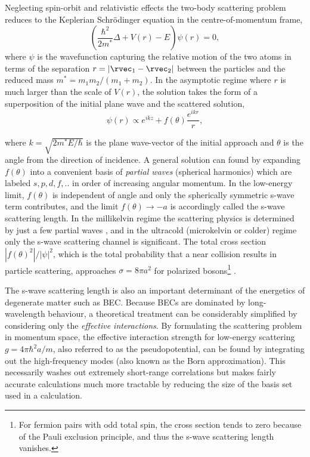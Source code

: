 	Neglecting spin-orbit and relativistic effects the two-body scattering problem reduces to the Keplerian Schr\"{o}dinger equation in the centre-of-momentum frame,
	\begin{equation}
	\left(\frac{\hbar^2}{2m^*}\Delta + V(r) - E\right)\psi(r) = 0,
	\end{equation}
	where $\psi$ is the wavefunction capturing the relative motion of the two atoms	in terms of the separation $r=|\rvec_1-\rvec_2|$ between the particles and the reduced mass $m^*=m_1m_2/(m_1+m_2)$.
	In the asymptotic regime where $r$ is much larger than the scale of $V(r)$, the solution takes the form of a superposition of the initial plane wave and the scattered solution,
	\begin{equation}
	\psi(r) \propto e^{ikz} + f(\theta)\frac{e^{ikr}}{r},
	\end{equation}

	where $k=\sqrt{2m^*E/\hbar}$ is the plane wave-vector of the initial approach and $\theta$ is the angle from the direction of incidence.
	A general solution can found by expanding $f(\theta)$ into a convenient basis of \emph{partial waves} (spherical harmonics) which are labeled $s,p,d,f,..$ in order of increasing angular momentum.
	In the low-energy limit, $f(\theta)$ is independent of angle and only the spherically symmetric s-wave term contributes, and the limit $f(\theta)\rightarrow-a$ is accordingly called the s-wave scattering length.
	In the millikelvin regime the scattering physics is determined by just a few partial waves \cite{Mcnamara07}, and in the ultracold (microkelvin or colder) regime only the s-wave scattering channel is significant.
	The total cross section $|f(\theta)^2|/|\psi|^2$, which is the total probability that a near collision results in particle scattering, approaches $\sigma=8\pi a^2$ for polarized bosons\footnote{For fermion pairs with odd total spin, the cross section tends to zero because of the Pauli exclusion principle, and thus the s-wave scattering length vanishes.} \cite{Przybytek05}.
	

	The s-wave scattering length is also an important determinant of the energetics of degenerate matter such as BEC.
	Because BECs are dominated by long-wavelength behaviour, a theoretical treatment can be considerably simplified by considering only the \emph{effective interactions}.
	By formulating the scattering problem in momentum space, the effective interaction strength for low-energy scattering  $g=4\pi \hbar^2 a/m$, also referred to as the pseudopotential, can be found by integrating out the high-frequency modes (also known as the Born approximation).
	This necessarily washes out extremely short-range correlations but makes fairly accurate calculations much more tractable by reducing the size of the basis set used in a calculation.

